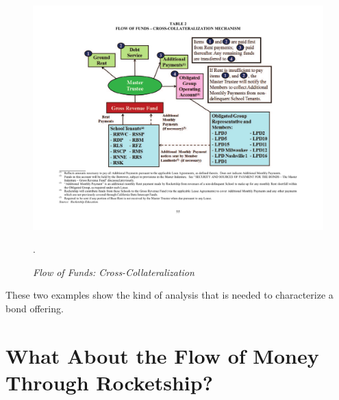 \begin{figure}[hbt]
  \centering
  \caption[Flow of Funds: Cross-Collateralization]{\textit{Flow of Funds: Cross-Collateralization}}\label{fig:flow_of_funds_cross-collateralization}
  \includegraphics[width=\textwidth]{Flow_of_Funds_Cross-Collateralization}\\
  \footnotesize\raggedright\textcite[55]{CSFA2017}.
\end{figure}

These two examples show the kind of analysis that is needed to characterize a bond offering.

\section{What About the Flow of Money Through Rocketship?}\label{sec:flows-of-money}\indent

